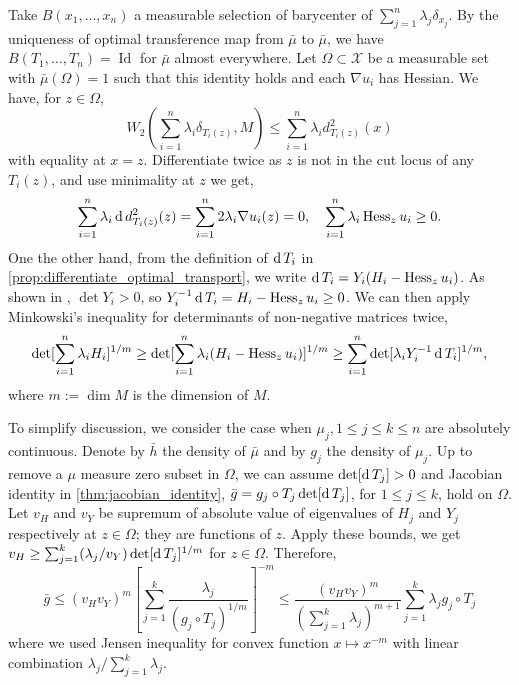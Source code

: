 Take $B(x_1,\ldots,x_n)$ a measurable selection of barycenter of $\sum_{j=1}^n \lambda_j \delta_{x_j}$.
By the uniqueness of optimal transference map from $\bar{\mu}$ to $\bar{\mu}$,
we have $B(T_1, \ldots, T_n) = \operatorname{Id}$ for $\bar{\mu}$ almost everywhere.
Let $\Omega \subset \mathcal{X} $ be a measurable set with $\bar{\mu}(\Omega) = 1 $ such that
this identity holds and each $\nabla u_i$ has Hessian.
We have, for $z \in \Omega$,
\[
	W_2(\sum_{i=1}^n \lambda_i \delta_{T_i(z)}, M) \leq \sum_{i=1}^n \lambda_i d_{T_i(z)}^2(x)
\] with equality at $x=z$.
Differentiate twice as $z$ is not in the cut locus of any $T_i(z)$,
and use minimality at $z$ we get,
\[
	\sum_{i=1}^n \lambda_i \operatorname{d} d^2_{T_i(z)} (z) =\sum_{i=1}^n 2 \lambda_i \nabla u_i (z) =0
	,\quad \sum_{i=1}^n \lambda_i \operatorname{Hess}_z u_i \geq 0.
\]
One the other hand, from the definition of $\operatorname{d} T_i$ in \cref{prop:differentiate_optimal_transport},
we write $\operatorname{d} T_i = Y_i ( H_i - \operatorname{Hess}_z u_i)$.
As shown in \cite[Lemma 2.1]{cordero2001riemannian}, $\det Y_i >0$,
so $Y_i^{-1} \operatorname{d} T_i = H_i - \operatorname{Hess}_z u_i \geq 0$.
We can then apply Minkowski's
inequality for determinants of non-negative matrices twice,
\[
	\det [\sum_{i=1}^n \lambda_i H_i]^{1/m} \geq \det [\sum_{i=1}^n \lambda_i(H_i - \operatorname{Hess}_z u_i)]^{1/m}
	\geq \sum_{i=1}^{n} \det[ \lambda_i Y_i^{-1} \operatorname{d} T_i]^{1/m},
\]
where $m := \dim M$ is the dimension of $M$.

To simplify discussion, we consider the case when $\mu_j, 1 \leq j \leq k \leq n$ are
absolutely continuous.
Denote by $\bar{h}$ the density of $\bar{\mu}$ and
by $g_j$ the density of $\mu_j$.
Up to remove a $\mu$ measure zero subset in $\Omega$,
we can assume $\det [\operatorname{d} T_j] >0$ and
Jacobian identity in \cref{thm:jacobian_identity},
$\bar{g} = g_j \circ T_j \det [\operatorname{d} T_j]$,
for $ 1\leq j \leq k$, hold on $\Omega$.
Let $v_H$ and $v_Y$ be supremum of absolute value
of eigenvalues of $H_j$ and $Y_j$ respectively at $z \in \Omega$;
they are functions of $z$.
Apply these bounds, we get
$v_H \geq \sum_{j=1}^k (\lambda_j / v_Y) \det [ \operatorname{d} T_j]^{1/m} $ for $z \in \Omega$.
Therefore,
\begin{equation}
	\label{equa:density_inequality}
	\bar{g} \leq (v_H v_Y)^m \left[  \sum_{j=1}^k \frac{ \lambda_j }
		{ (g_j \circ T_j)^{1/m}} \right]^{-m}
	\leq \frac{ (v_H v_Y)^m }{(\sum_{j=1}^k \lambda_j)^{m+1}}
	\sum_{j=1}^k \lambda_j g_j \circ T_j
\end{equation}
where we used Jensen inequality for convex function $x \mapsto x^{-m}$
with linear combination $\lambda_j / \sum_{j=1}^k \lambda_j$.

